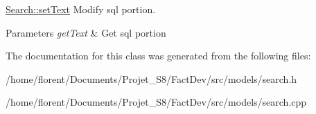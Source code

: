 \hyperlink{classModels_1_1Search_a1bd00e3da5d5e10b4bec6579fb1c8bfa}{Search\-::set\-Text} Modify sql portion. 


\begin{DoxyParams}{Parameters}
{\em get\-Text} & Get sql portion \\
\hline
\end{DoxyParams}


The documentation for this class was generated from the following files\-:\begin{DoxyCompactItemize}
\item 
/home/florent/\-Documents/\-Projet\-\_\-\-S8/\-Fact\-Dev/src/models/search.\-h\item 
/home/florent/\-Documents/\-Projet\-\_\-\-S8/\-Fact\-Dev/src/models/search.\-cpp\end{DoxyCompactItemize}
